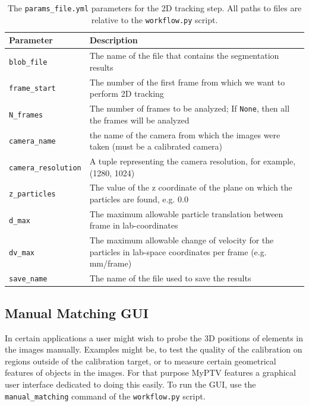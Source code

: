 \documentclass[10pt,a4paper]{article}
\begin{document}
%
\begin{table}[!ht]
	\centering
	\caption{The \texttt{params\_file.yml} parameters for the 2D tracking step. All paths to files are relative to the \texttt{workflow.py} script. \label{tab:2d_tracking}}
	\begin{tabular}{l m{10cm}}
		\hline
		Parameter & Description\\
		\hline
		
		\texttt{blob\_file} & The name of the file that contains the segmentation results \\
		\texttt{frame\_start} & The number of the first frame from which we want to perform 2D tracking \\
		\texttt{N\_frames} & The number of frames to be analyzed; If \texttt{None}, then all the frames will be analyzed \\
		\texttt{camera\_name} & the name of the camera from which the images were taken (must be a calibrated camera) \\
		\texttt{camera\_resolution} & A tuple representing the camera resolution, for example, (1280, 1024) \\
		\texttt{z\_particles} & The value of the z coordinate of the plane on which the particles are found, e.g. 0.0 \\
		\texttt{d\_max} &  The maximum allowable particle translation between frame in lab-coordinates\\
		\texttt{dv\_max} & The maximum allowable change of velocity for the particles in lab-space coordinates per frame (e.g. mm/frame) \\
		\texttt{save\_name} & The name of the file used to save the results \\
		
		\hline
	\end{tabular}
\end{table}











\subsection{Manual Matching GUI} \label{sec:man_match}

In certain applications a user might wish to probe the 3D positions of elements in the images manually. Examples might be, to test the quality of the calibration on regions outside of the calibration target, or to measure certain geometrical features of objects in the images. For that purpose MyPTV features a graphical user interface dedicated to doing this easily. To run the GUI, use the \texttt{manual\_matching} command of the \texttt{workflow.py} script. 
\end{document}
